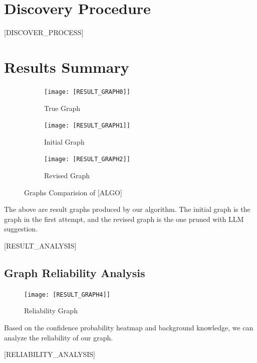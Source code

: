 \documentclass{article}
\begin{document}
\section{Discovery Procedure}
[DISCOVER_PROCESS]

\section{Results Summary}

\begin{figure}[H]
    \centering
    \begin{subfigure}{0.3\textwidth}
        \centering
        \vspace{-0.5cm}
        \texttt{[image: [RESULT\_GRAPH0]]}
        \vfill
        \caption{True Graph}
        \label{fig:sub1}
    \end{subfigure}
    \hspace{0.04\textwidth}
    \begin{subfigure}{0.3\textwidth}
        \centering
        \vspace{-0.5cm}
        \texttt{[image: [RESULT\_GRAPH1]]}
        \vfill
        \caption{Initial Graph}
        \label{fig:sub2}
    \end{subfigure}
    \hspace{0.04\textwidth}
    \begin{subfigure}{0.3\textwidth}
        \centering
        \vspace{-0.5cm}
        \texttt{[image: [RESULT\_GRAPH2]]}
        \vfill
        \caption{Revised Graph}
        \label{fig:sub3}
    \end{subfigure}
    \caption{Graphs Comparision of [ALGO]}
    \label{fig:main}
\end{figure}

The above are result graphs produced by our algorithm.
The initial graph is the graph in the first attempt, and the revised graph is the one pruned with LLM suggestion.

[RESULT_ANALYSIS]

\subsection{Graph Reliability Analysis}

\begin{figure}[H]
        \centering
        \vspace{-0.5cm}
        \texttt{[image: [RESULT\_GRAPH4]]}
        \caption{Reliability Graph}
        \label{fig:sub3}
\end{figure}

Based on the confidence probability heatmap and background knowledge, we can analyze the reliability of our graph.

[RELIABILITY_ANALYSIS]

\end{document}
